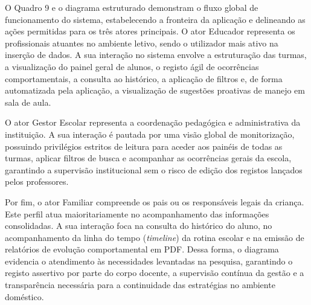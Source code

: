 O Quadro 9 e o diagrama estruturado demonstram o fluxo global de funcionamento do sistema, estabelecendo a fronteira da aplicação e delineando as ações permitidas para os três atores principais. O ator Educador representa os profissionais atuantes no ambiente letivo, sendo o utilizador mais ativo na inserção de dados. A sua interação no sistema envolve a estruturação das turmas, a visualização do painel geral de alunos, o registo ágil de ocorrências comportamentais, a consulta ao histórico, a aplicação de filtros e, de forma automatizada pela aplicação, a visualização de sugestões proativas de manejo em sala de aula.

O ator Gestor Escolar representa a coordenação pedagógica e administrativa da instituição. A sua interação é pautada por uma visão global de monitorização, possuindo privilégios estritos de leitura para aceder aos painéis de todas as turmas, aplicar filtros de busca e acompanhar as ocorrências gerais da escola, garantindo a supervisão institucional sem o risco de edição dos registos lançados pelos professores.

Por fim, o ator Familiar compreende os pais ou os responsáveis legais da criança. Este perfil atua maioritariamente no acompanhamento das informações consolidadas. A sua interação foca na consulta do histórico do aluno, no acompanhamento da linha do tempo (\textit{timeline}) da rotina escolar e na emissão de relatórios de evolução comportamental em PDF. Dessa forma, o diagrama evidencia o atendimento às necessidades levantadas na pesquisa, garantindo o registo assertivo por parte do corpo docente, a supervisão contínua da gestão e a transparência necessária para a continuidade das estratégias no ambiente doméstico.

